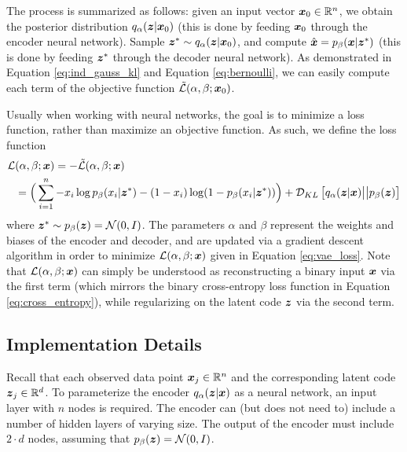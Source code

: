 The process is summarized as follows: given an input vector $\boldsymbol{x}_0 \in \mathbb{R}^n$, we obtain the posterior distribution $q_\alpha(\boldsymbol{z} | \boldsymbol{x}_0)$ (this is done by feeding $\boldsymbol{x}_0$ through the encoder neural network). Sample $\boldsymbol{z}^* \sim q_\alpha(\boldsymbol{z} |\boldsymbol{x}_0)$, and compute $\hat{\boldsymbol{x}} = p_\beta(\boldsymbol{x} | \boldsymbol{z}^*)$ (this is done by feeding $\boldsymbol{z}^*$ through the decoder neural network). As demonstrated in Equation \ref{eq:ind_gauss_kl} and Equation \ref{eq:bernoulli}, we can easily compute each term of the objective function $\tilde{\mathcal{L}}(\alpha, \beta; \boldsymbol{x}_0)$.

Usually when working with neural networks, the goal is to minimize a loss function, rather than maximize an objective function. As such, we define the loss function 
\begin{equation}
  \label{eq:vae_loss}
  \begin{split}
  \mathcal{L}&(\alpha, \beta; \boldsymbol{x}) = - \tilde{\mathcal{L}}(\alpha, \beta;\boldsymbol{x}) \\
  &= \Big(\sum_{i=1}^n - x_i\log p_\beta(x_i | \boldsymbol{z}^*) - (1-x_i)\log (1-p_\beta(x_i | \boldsymbol{z}^*)) \Big) + \mathcal{D}_{KL}\left[ q_\alpha(\boldsymbol{z} | \boldsymbol{x}) \big|\big| p_\beta(\boldsymbol{z}) \right]
  \end{split}
\end{equation}
where $\boldsymbol{z}^* \sim p_\beta(\boldsymbol{z}) = \mathcal{N}(0,I)$. The parameters $\alpha$ and $\beta$ represent the weights and biases of the encoder and decoder, and are updated via a gradient descent algorithm in order to minimize $\mathcal{L}(\alpha, \beta; \boldsymbol{x})$ given in Equation \ref{eq:vae_loss}. Note that $\mathcal{L}(\alpha, \beta; \boldsymbol{x})$ can simply be understood as reconstructing a binary input $\boldsymbol{x}$ via the first term (which mirrors the binary cross-entropy loss function in Equation \ref{eq:cross_entropy}), while regularizing on the latent code $\boldsymbol{z}$ via the second term.


\subsection{Implementation Details}
Recall that each observed data point $\boldsymbol{x}_j \in \mathbb{R}^n$ and the corresponding latent code $\boldsymbol{z}_j \in \mathbb{R}^d$. To parameterize the encoder $q_\alpha(\boldsymbol{z} | \boldsymbol{x})$ as a neural network, an input layer with $n$ nodes is required. The encoder can (but does not need to) include a number of hidden layers of varying size. The output of the encoder must include $2\cdot d$ nodes, assuming that $p_\beta(\boldsymbol{z}) = \mathcal{N}(0,I)$. 

